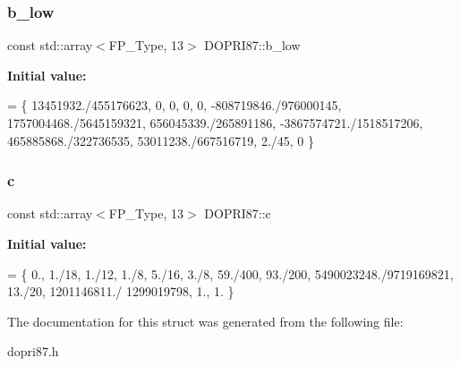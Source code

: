 \subsubsection{\texorpdfstring{b\+\_\+low}{b\_low}}
{\footnotesize\ttfamily const std\+::array$<$F\+P\+\_\+\+Type, 13$>$ D\+O\+P\+R\+I87\+::b\+\_\+low}

{\bfseries Initial value\+:}
\begin{DoxyCode}
= \{
     13451932./455176623, 0, 0, 0, 0, -808719846./976000145, 1757004468./5645159321, 656045339./265891186, 
        -3867574721./1518517206,   465885868./322736535,  53011238./667516719, 2./45, 0
   \}
\end{DoxyCode}
\mbox{\label{structDOPRI87_a4920ff4638ecba0061800d7c456d920d}} 
\subsubsection{\texorpdfstring{c}{c}}
{\footnotesize\ttfamily const std\+::array$<$F\+P\+\_\+\+Type, 13$>$ D\+O\+P\+R\+I87\+::c}

{\bfseries Initial value\+:}
\begin{DoxyCode}
= \{
    0., 1./18, 1./12, 1./8, 5./16, 3./8, 59./400, 93./200, 5490023248./9719169821, 13./20, 1201146811./
      1299019798, 1., 1.
  \}
\end{DoxyCode}


The documentation for this struct was generated from the following file\+:\begin{DoxyCompactItemize}
\item 
dopri87.\+h\end{DoxyCompactItemize}
